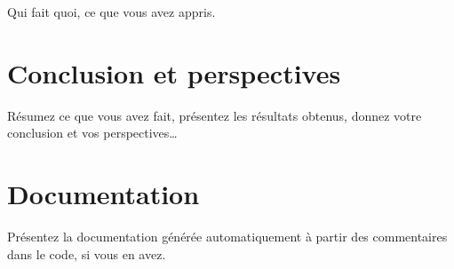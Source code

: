 \documentclass[11pt,a4paper]{article}
\begin{document}
Qui fait quoi, ce que vous avez appris.

\section{Conclusion et perspectives}

Résumez ce que vous avez fait, présentez les résultats obtenus, donnez votre conclusion et vos perspectives\dots

% 
% 

\appendix

\appendixpage
\addappheadtotoc

\section{Documentation}

Présentez la documentation générée automatiquement à partir des commentaires dans le code, si vous en avez.
\end{document}
